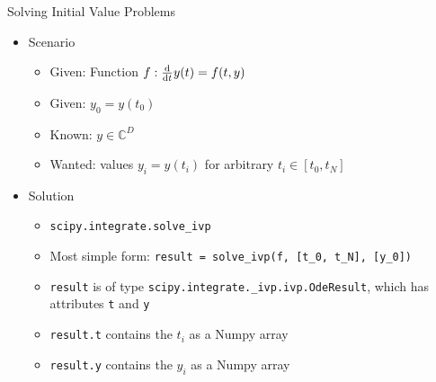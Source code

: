 
\begin{frame}{Solving Initial Value Problems}
%
\begin{itemize}
\item Scenario
	\begin{itemize}
	\item Given: Function $f: \dv{t} y(t) = f(t, y)$
	\item Given: $y_0 = y(t_0)$
	\item Known: $y \in \mathbb{C}^{D}$
	\item Wanted: values $y_i = y(t_i)$ for arbitrary $t_i \in [t_0, t_N]$
	\end{itemize}
\item Solution
	\begin{itemize}
	\item \texttt{scipy.integrate.solve\_ivp}
	\item Most simple form: \texttt{result = solve\_ivp(f, [t\_0, t\_N], [y\_0])}
	\item \texttt{result} is of type \texttt{scipy.integrate.\_ivp.ivp.OdeResult}, which has attributes \texttt{t} and \texttt{y}
	\item \texttt{result.t} contains the $t_i$ as a Numpy array
	\item \texttt{result.y} contains the $y_i$ as a Numpy array
	\end{itemize}
\end{itemize}
%
\end{frame}


